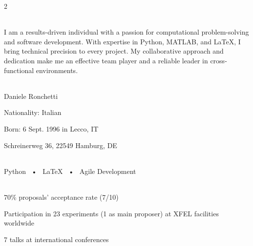 \documentclass[lighthipster]{simplehipstercv}
\begin{document}
\begin{paracol}{2}

    \paracolbackgroundoptions



    \footnotesize
    {\setasidefontcolour
    \flushright

    \begin{center}
    \end{center}

    \\[0.5em]
    {\footnotesize
    I am a results-driven individual with a passion for computational problem-solving and software development. With expertise in Python, MATLAB, and \LaTeX{}, I bring technical precision to every project. My collaborative approach and dedication make me an effective team player and a reliable leader in cross-functional environments.}
    \bigskip

     \\[0.5em]
    Daniele Ronchetti

    Nationality: Italian

    Born: 6 Sept. 1996 in Lecco, IT

     Schreinerweg 36, 22549 Hamburg, DE
    \bigskip

     \\
    Python ~•~ \LaTeX{} ~•~ Agile Development
    \bigskip

     \\[0.5em]
     70\% proposals' acceptance rate (7/10)

     Participation in 23 experiments (1 as main proposer) at XFEL facilities worldwide

     7 talks at international conferences

    \bigskip


}
\end{paracol}
\end{document}
